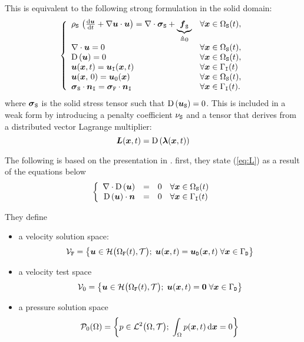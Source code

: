 \documentclass[10pt,a4paper]{article}
\begin{document}
This is equivalent to the following strong formulation in the solid domain:
\begin{equation}
\left\{
\begin{array}{ll}
\rhos\,\left(\dt{\vu} + \grad \vu\cdot \vu \right)= \div \vsigmas + \underbrace{\vf_\labs}_{\triangleq 0} & \forall \vx \in \doms(t),\\
\div \vu = 0 & \forall \vx \in \doms(t), \\
\D{\vu} = 0 & \forall \vx \in \doms(t), \\
\vu(\vx,t)=\vui(\vx,t) & \forall \vx \in \boui(t) \\
\vu(\vx, \,0) = \vu_{\mathrm{0}}(\vx) & \forall \vx \in \doms(t), \\
\vsigmas\cdot \vn_{\labi} = \vsigmaf\cdot \vn_{\labi} & \forall \vx \in \boui(t).
\end{array}
\right.
\end{equation}
where $\vsigmas$ is the solid stress tensor such that $\D{\vus}=0$. This is included in a weak form by introducing a penalty coefficient $\nus$ and a tensor that derives from a distributed vector Lagrange multiplier:
\begin{equation}
\label{eq:L}
\vec L(\vx, t) = \D{\vlambda(\vx, t)}
\end{equation}


The following is based on the presentation in \cite[]{patankar2000new}. first, they state (\ref{eq:L}) as a result of the equations below
\begin{eqnarray}
\label{eq:L_constraints}
\left\{ 
\begin{array}{rcll}
\div {\D \vu} &=& 0 &\forall \vx \in \doms(t) \\
\D \vu \cdot \vec n &=& 0 &\forall \vx \in \boui(t)
\end{array}
\right.
\end{eqnarray}



They define
\begin{itemize}
\item a velocity solution space: 
$$\sVf = \left\{\vu \in \sH\big(\domf(t), \sT\big);\;\vu(\vx, t) = \vud(\vx, t)\; \forall \vx \in \boud \right\}$$
\item a velocity test space 
$$\sV_0 = \left\{\vu \in \sH\big(\domf(t), \sT\big);\;\vu(\vx, t) = \vec 0 \; \forall \vx \in \boud \right\}$$
\item a pressure solution space
$$\sP_0(\dom) = \left\{p \in \sL^2\big(\dom, \sT\big);\; \int_{\dom}p(\vx, t) \,\d\vx = 0 \right\}$$
\end{itemize}
\end{document}
